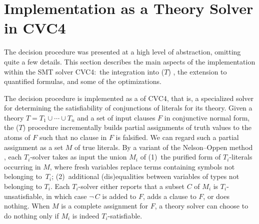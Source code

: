 \section{Implementation as a Theory Solver in CVC4}
\label{sec:implementation-as-a-theory-solver-in-cvc4}

The decision procedure was presented at a high level of abstraction, omitting
quite a few details. This section describes the main aspects of the
implementation within the SMT solver CVC4:\ the integration into \XXXL($T$)
\cite{ganzinger-et-al-2004}, the extension to quantified formulas, and some of
the optimizations.


The decision procedure is implemented as a  of CVC4, that is, a
specialized solver for determining the satisfiability of conjunctions of
literals for its theory.
Given a theory $T = T_1 \mathrel\cup \cdots \mathrel\cup T_n$ and a set of
input clauses $F$ in conjunctive normal form, the \XXXL($T$) procedure
incrementally builds partial assignments of
truth values to the atoms of $F$ such that no clause in $F$ is falsified. We can regard such a
partial assignment as a set $M$ of true literals.
By a variant of the Nelson--Oppen method \cite{jovanovic2011sharing,nelson-oppen-1979},
each $T_i$-solver %
takes as input the union $M_i$
of (1)~the purified form of $T_i$-literals occurring in $M$, where fresh
variables replace terms containing symbols not belonging to~$T_i$;
(2)~additional (dis)equalities between variables of types not belonging to
$T_i$. Each $T_i$-solver
either reports that a subset $C$ of $M_i$ is $T_i$-unsatisfiable, in which case
$\neg\, C$ is added to $F\!$, adds a clause to $F\!$, or does nothing.
When $M$ is a complete assignment for $F\!$, a theory solver can choose to do
nothing only if $M_i$ is indeed $T_i$-satisfiable.


